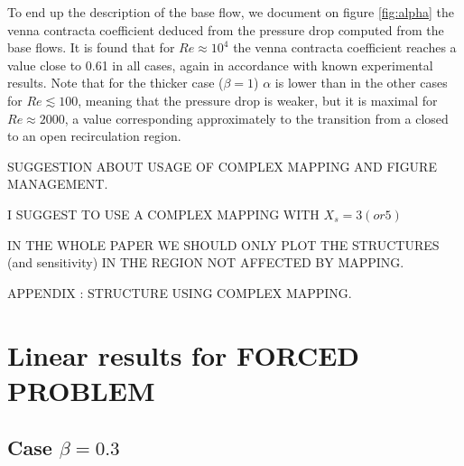 \documentclass{jfm}
\begin{document}
To end up the description of the base flow, we document on figure \ref{fig:alpha} the venna contracta coefficient
deduced from the pressure drop computed from the base flows. It is found that for $Re \approx 10^4$ the venna contracta coefficient reaches a value close to 0.61 in all cases, again in accordance with known experimental results. Note that for the thicker case ($\beta=1$) $\alpha$ is lower than in the other cases for $Re \lesssim 100$, 
meaning that the pressure drop is weaker, but it is maximal for $Re \approx 2000$, a value corresponding approximately to the transition from a closed to an open recirculation region.




SUGGESTION ABOUT USAGE OF COMPLEX MAPPING AND FIGURE MANAGEMENT.

I SUGGEST TO USE A COMPLEX MAPPING WITH $X_s=3 (or 5)$

IN THE WHOLE PAPER WE SHOULD ONLY PLOT THE STRUCTURES (and sensitivity) IN THE REGION NOT AFFECTED BY MAPPING.

APPENDIX : STRUCTURE USING COMPLEX MAPPING.



\section{Linear results for FORCED PROBLEM}

\subsection{Case $\beta = 0.3$}
\end{document}
